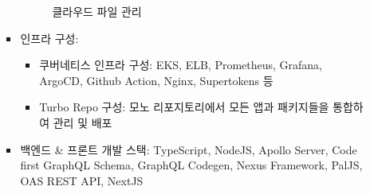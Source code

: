 \begin{itemize}
\begin{itemize}
\begin{itemize}[label=$\star$]
\begin{figure}[!ht]
\begin{fullwidth}
{					            \caption*{클라우드 파일 관리}
				            }
			            \end{fullwidth}
		            \end{figure}
		      \item 인프라 구성:
		            \begin{itemize}
			            \item 쿠버네티스 인프라 구성: EKS, ELB, Prometheus, Grafana, ArgoCD, Github Action, Nginx, Supertokens 등
			            \item Turbo Repo 구성: 모노 리포지토리에서 모든 앱과 패키지들을 통합하여 관리 및 배포
		            \end{itemize}
		      \item 백엔드 \& 프론트 개발 스택: TypeScript, NodeJS, Apollo Server, Code first GraphQL Schema, GraphQL Codegen, Nexus Framework, PalJS, OAS REST API, NextJS
	      \end{itemize}


\end{itemize}
\end{itemize}
